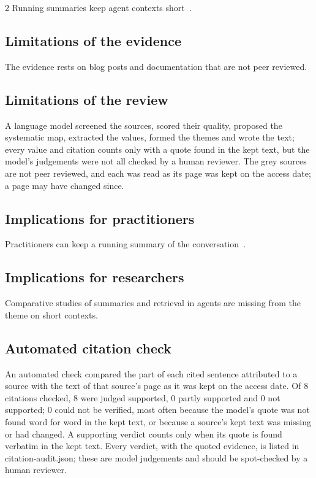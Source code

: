 \documentclass[10pt,a4paper]{article}
\begin{document}
\begin{multicols*}{2}
Running summaries keep agent contexts short~\cite{ana2025managing}.

\subsection{Limitations of the evidence}\label{sec:limitations-of-the-evidence}

The evidence rests on blog posts and documentation that are not peer reviewed.

\subsection{Limitations of the review}\label{sec:limitations-of-the-review}

A language model screened the sources, scored their quality, proposed the systematic map, extracted the values, formed the themes and wrote the text; every value and citation counts only with a quote found in the kept text, but the model's judgements were not all checked by a human reviewer.
The grey sources are not peer reviewed, and each was read as its page was kept on the access date; a page may have changed since.

\subsection{Implications for practitioners}\label{sec:implications-for-practitioners}

Practitioners can keep a running summary of the conversation~\cite{ana2025managing}.

\subsection{Implications for researchers}\label{sec:implications-for-researchers}

Comparative studies of summaries and retrieval in agents are missing from the theme on short contexts.

\subsection{Automated citation check}\label{sec:automated-citation-check}

An automated check compared the part of each cited sentence attributed to a source with the text of that source's page as it was kept on the access date.
Of 8 citations checked, 8 were judged supported, 0 partly supported and 0 not supported; 0 could not be verified, most often because the model's quote was not found word for word in the kept text, or because a source's kept text was missing or had changed.
A supporting verdict counts only when its quote is found verbatim in the kept text.
Every verdict, with the quoted evidence, is listed in citation-audit.\allowbreak{}json; these are model judgements and should be spot-checked by a human reviewer.


\end{multicols*}
\end{document}
